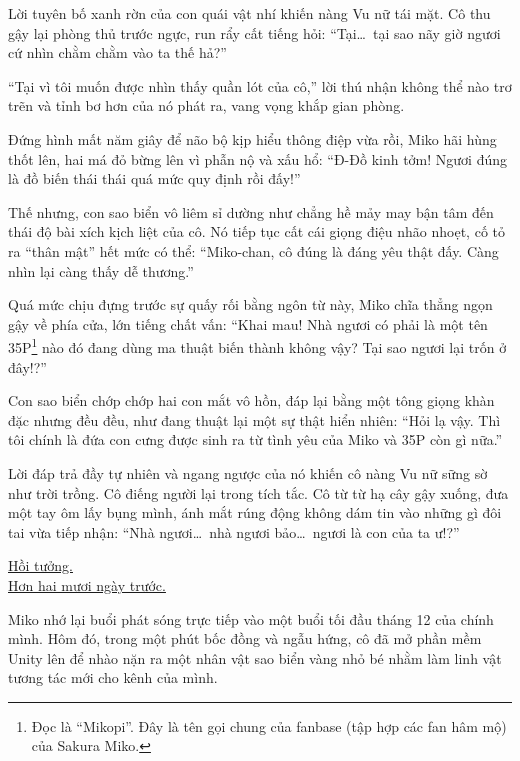 \documentclass[../main.tex]{subfiles}
\begin{document}

Lời tuyên bố xanh rờn của con quái vật nhí khiến nàng Vu nữ tái mặt. Cô thu gậy lại phòng thủ trước ngực, run rẩy cất tiếng hỏi: ``Tại\dots\ tại sao nãy giờ ngươi cứ nhìn chằm chằm vào ta thế hả?''

``Tại vì tôi muốn được nhìn thấy quần lót của cô,'' lời thú nhận không thể nào trơ trẽn và tỉnh bơ hơn của nó phát ra, vang vọng khắp gian phòng.

Đứng hình mất năm giây để não bộ kịp hiểu thông điệp vừa rồi, Miko hãi hùng thốt lên, hai má đỏ bừng lên vì phẫn nộ và xấu hổ: ``Đ-Đồ kinh tởm! Ngươi đúng là đồ biến thái thái quá mức quy định rồi đấy!''

Thế nhưng, con sao biển vô liêm sỉ dường như chẳng hề mảy may bận tâm đến thái độ bài xích kịch liệt của cô. Nó tiếp tục cất cái giọng điệu nhão nhoẹt, cố tỏ ra ``thân mật'' hết mức có thể: ``Miko-chan, cô đúng là đáng yêu thật đấy. Càng nhìn lại càng thấy dễ thương.''

Quá mức chịu đựng trước sự quấy rối bằng ngôn từ này, Miko chĩa thẳng ngọn gậy về phía cửa, lớn tiếng chất vấn: ``Khai mau! Nhà ngươi có phải là một tên 35P\footnote{Đọc là ``Mikopi''. Đây là tên gọi chung của fanbase (tập hợp các fan hâm mộ) của Sakura Miko.} nào đó đang dùng ma thuật biến thành không vậy? Tại sao ngươi lại trốn ở đây!?''

Con sao biển chớp chớp hai con mắt vô hồn, đáp lại bằng một tông giọng khàn đặc nhưng đều đều, như đang thuật lại một sự thật hiển nhiên: ``Hỏi lạ vậy. Thì tôi chính là đứa con cưng được sinh ra từ tình yêu của Miko và 35P còn gì nữa.''

Lời đáp trả đầy tự nhiên và ngang ngược của nó khiến cô nàng Vu nữ sững sờ như trời trồng. Cô điếng người lại trong tích tắc. Cô từ từ hạ cây gậy xuống, đưa một tay ôm lấy bụng mình, ánh mắt rúng động không dám tin vào những gì đôi tai vừa tiếp nhận: ``Nhà ngươi\dots\ nhà ngươi bảo\dots\ ngươi là con của ta ư!?''


\begin{center}
  \underline{Hồi tưởng.}\\
  \underline{Hơn hai mươi ngày trước.}
\end{center}

Miko nhớ lại buổi phát sóng trực tiếp vào một buổi tối đầu tháng 12 của chính mình. Hôm đó, trong một phút bốc đồng và ngẫu hứng, cô đã mở phần mềm Unity lên để nhào nặn ra một nhân vật sao biển vàng nhỏ bé nhằm làm linh vật tương tác mới cho kênh của mình.
\end{document}
